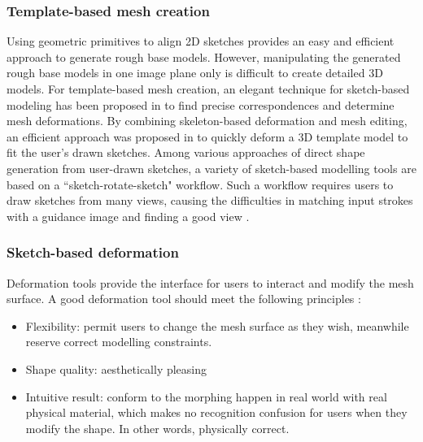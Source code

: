 \documentclass[runningheads]{llncs}
\begin{document}
\subsubsection{Template-based mesh creation} Using geometric primitives to align 2D sketches provides an easy and efficient approach to generate rough base models. However, manipulating the generated rough base models in one image plane only is difficult to create detailed 3D models. For template-based mesh creation, an elegant technique for sketch-based modeling has been proposed in \cite{kraevoy2009modeling} to find precise correspondences and determine mesh deformations. By combining skeleton-based deformation and mesh editing, an efficient approach was proposed in \cite{kazmi2015efficient} to quickly deform a 3D template model to fit the user’s drawn sketches. Among various approaches of direct shape generation from user-drawn sketches, a variety of sketch-based modelling tools are based on a “sketch-rotate-sketch" workflow. Such a workflow requires users to draw sketches from many views, causing the difficulties in matching input strokes with a guidance image and finding a good view \cite{gingold2009structured}.

\subsubsection{Sketch-based deformation}Deformation tools provide the interface for users to interact and modify the mesh surface. A good deformation tool should meet the following principles \cite{botsch2008linear}:
\begin{itemize}
    \item Flexibility: permit users to change the mesh surface as they wish, meanwhile reserve correct modelling constraints.
    \item Shape quality: aesthetically pleasing
    \item Intuitive result: conform to the morphing happen in real world with real physical material, which makes no recognition confusion for users when they modify the shape. In other words, physically correct.
\end{itemize}
\end{document}
